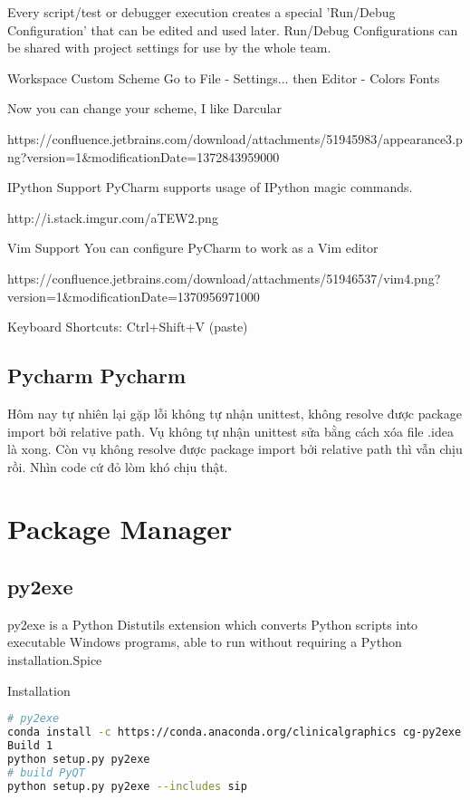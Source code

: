Every script/test or debugger execution creates a special 'Run/Debug Configuration' that can be edited and used later. Run/Debug Configurations can be shared with project settings for use by the whole team.

Workspace
Custom Scheme
Go to File - Settings... then Editor - Colors Fonts

Now you can change your scheme, I like Darcular

https://confluence.jetbrains.com/download/attachments/51945983/appearance3.png?version=1&modificationDate=1372843959000

IPython Support
PyCharm supports usage of IPython magic commands.

http://i.stack.imgur.com/aTEW2.png

Vim Support
You can configure PyCharm to work as a Vim editor

https://confluence.jetbrains.com/download/attachments/51946537/vim4.png?version=1&modificationDate=1370956971000

Keyboard Shortcuts: Ctrl+Shift+V (paste)

\subsection{Pycharm Pycharm}


Hôm nay tự nhiên lại gặp lỗi không tự nhận unittest, không resolve được package import bởi relative path. Vụ không tự nhận unittest sửa bằng cách xóa file .idea là xong. Còn vụ không resolve được package import bởi relative path thì vẫn chịu rồi. Nhìn code cứ đỏ lòm khó chịu thật.

\section{Package Manager}

\subsection{py2exe}

py2exe is a Python Distutils extension which converts Python scripts into executable Windows programs, able to run without requiring a Python installation.Spice

Installation
\begin{lstlisting}[language=bash]
# py2exe
conda install -c https://conda.anaconda.org/clinicalgraphics cg-py2exe
Build 1
python setup.py py2exe
# build PyQT
python setup.py py2exe --includes sip
\end{lstlisting}


